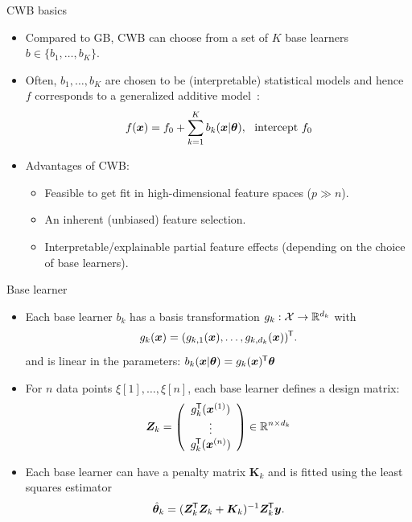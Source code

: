 \documentclass[t,10pt]{beamer}
\newcommand{\penMat}{\bm{K}}
\newcommand{\fSlide}[2]{
\begin{frame}[plain]{}%
  \vspace{4cm}%
  \Large #1\\[0.2cm]%
  {\LARGE\textbf{#2}}%
	\addtocounter{framenumber}{-1}%
\end{frame}%
}
\begin{document}

\begin{frame}{CWB basics}
  \begin{itemize}
    \item
      Compared to GB, CWB can choose from a set of $K$ base learners $b \in \{b_1, \dots, b_K\}$.


    \item
      Often, $b_1, \dots, b_K$ are chosen to be (interpretable) statistical models and hence $f$ corresponds to a generalized additive model~\citep[GAM;][]{hastie2017generalized}: \[f(\xv) = f_0 + \sum_{k=1}^K b_k(\xv | \tb), \ \ \text{intercept}\ f_0\]

    \item
      Advantages of CWB:
      \begin{itemize}
        \item
          Feasible to get fit in high-dimensional feature spaces ($p \gg n$).

        \item
          An inherent (unbiased) feature selection.

        \item
          Interpretable/explainable partial feature effects (depending on the choice of base learners).
      \end{itemize}
  \end{itemize}
\end{frame}

\begin{frame}{Base learner}
  \begin{itemize}
    \item
      Each base learner $b_k$ has a basis transformation $g_k : \Xspace \to \R^{d_k}$ with \[g_k(\xv) = (g_{k,1}(\xv), \dots, g_{k,d_k}(\xv))^\tran.\] and is linear in the parameters: $b_k(\xv | \tb) = g_k(\xv)^\tran \tb$

    \item
      For $n$ data points $\xi[1], \dots, \xi[n]$, each base learner defines a design matrix: \[
      \design_k = \left(\begin{array}{c}
      g_{k}^\tran(\xi[1]) \\
      \vdots \\
      g_{k}^\tran(\xi[n])\end{array}\right)\in\R^{n\times d_k}\]

    \item
      Each base learner can have a penalty matrix $\penMat_k$ and is fitted using the least squares estimator \[\tbh_k = (\design_\blk^\tran \design_\blk + \penMat_k)^{-1} \design_k^\tran \yv.\]
  \end{itemize}
\end{frame}
\end{document}
